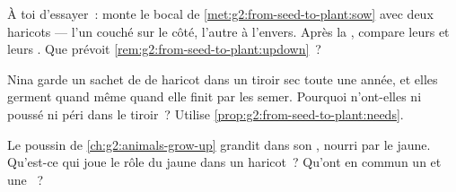 \begin{exercise}[$\star$]\label{exo:g2:from-seed-to-plant:8}
À toi d'essayer~: monte le bocal de
\cref{met:g2:from-seed-to-plant:sow} avec deux haricots --- l'un
couché sur le côté, l'autre à l'envers. Après la ,
compare leurs  et leurs . Que prévoit
\cref{rem:g2:from-seed-to-plant:updown}~?
\end{exercise}

\begin{exercise}[$\star\star$]\label{exo:g2:from-seed-to-plant:9}
Nina garde un sachet de  de haricot dans un tiroir sec toute
une année, et elles germent quand même quand elle finit par les
semer. Pourquoi n'ont-elles ni poussé ni péri dans le tiroir~?
Utilise \cref{prop:g2:from-seed-to-plant:needs}.
\end{exercise}

\begin{exercise}[$\star\star$]\label{exo:g2:from-seed-to-plant:10}
Le poussin de \cref{ch:g2:animals-grow-up} grandit dans son ,
nourri par le jaune. Qu'est-ce qui joue le rôle du jaune dans un
haricot~? Qu'ont en commun un  et une ~?
\end{exercise}

